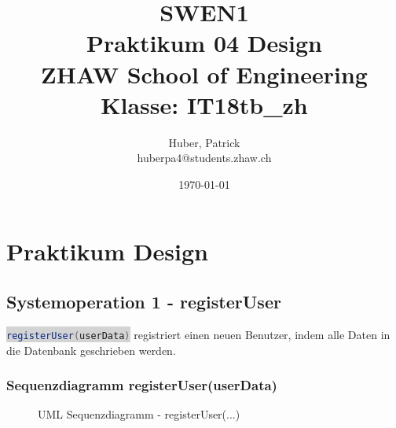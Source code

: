 \documentclass[11pt,ngerman]{article}
\newcommand{\inlinecode}[2]{\colorbox{lightgray}{\lstinline[language=#1]$#2$}}
\begin{document}
    \title{SWEN1\\Praktikum 04 Design\\
        \vspace{1cm}
        \small{ZHAW  School of Engineering\\Klasse: IT18tb\_zh}
        \vspace{1.5cm}
    }
    \author{
        Huber, Patrick\\
        \small{huberpa4@students.zhaw.ch}
        \vspace{1.5cm}
    }
   \date{\today}

    \maketitle
    \newpage

    \tableofcontents
    \listoffigures
    \newpage

    \section{Praktikum Design}

    \subsection{Systemoperation 1 - registerUser}
     \inlinecode{Java}{registerUser(userData)} registriert einen neuen Benutzer, indem alle Daten in die Datenbank geschrieben werden.

        \subsubsection{Sequenzdiagramm registerUser(userData)}
        \label{sssec:Sequenzdiagramm_registerUser}
        \begin{figure}[H]
            \centering
            \caption{UML Sequenzdiagramm - registerUser(...)}
            \label{fig:Sequenzdiagramm_registerUser}
        \end{figure}
\end{document}
